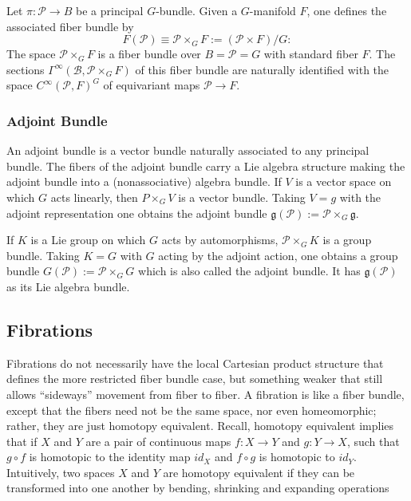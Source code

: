 \documentclass{article}
\theoremstyle{definition}
\begin{document}
    Let $\pi : \mathcal P \rightarrow B$ be a principal $G$-bundle. Given a
    $G$-manifold $F$, one defines the associated fiber bundle by
    \[
    F (\mathcal P) \equiv \mathcal P \times_G F := (\mathcal P \times F) / G:
    \]
    The space $\mathcal P \times_G F$ is a fiber bundle over $B = \mathcal P=G$ with standard fiber $F$. The sections  $\Gamma^\infty(\mathcal B, \mathcal P \times_G F )$ of this fiber bundle are naturally identified with the space $C^\infty (\mathcal P, F )^G$ of equivariant maps $\mathcal P \rightarrow F$.

\subsubsection{Adjoint Bundle} 

    An adjoint bundle is a vector bundle naturally associated to any principal bundle. The fibers of the adjoint bundle carry a Lie algebra structure making the adjoint bundle into a (nonassociative) algebra bundle. If $V$ is a vector space on which $G$ acts linearly, then $P \times_G V$ is a vector bundle. Taking $V = g$ with the adjoint representation one obtains the adjoint bundle $\mathfrak g(\mathcal P ) := \mathcal P \times_G \mathfrak g$.
    
    If $K$ is a Lie group on which $G$ acts by automorphisms, $\mathcal P \times_G K$ is a group bundle. Taking $K = G$ with $G$ acting by the adjoint action, one obtains a group bundle $G( \mathcal P) := \mathcal P \times_G G$ which is also called the adjoint bundle. It has $\mathfrak g( \mathcal P)$ as its Lie algebra bundle.   

\subsection{Fibrations}
    Fibrations do not necessarily have the local Cartesian product structure that defines the more restricted fiber bundle case, but something weaker that still allows ``sideways'' movement from fiber to fiber. A fibration is like a fiber bundle, except that the fibers need not be the same space, nor even homeomorphic; rather, they are just homotopy equivalent.  Recall, homotopy equivalent implies that if $X$ and $Y$ are a pair of continuous maps $f : X \rightarrow Y$ and $g : Y \rightarrow X$, such that $g \circ f$ is homotopic to the identity map $id_X$ and $f \circ g$ is homotopic to $id_Y$. Intuitively, two spaces $X$ and $Y$ are homotopy equivalent if they can be transformed into one another by bending, shrinking and expanding operations
    
\end{document}
